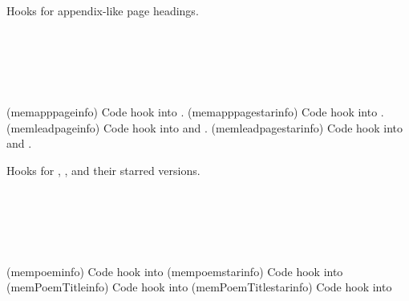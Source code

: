 Hooks for appendix-like page headings.
\begin{syntax}
\cmd{\memapppageinfo} \\
\cmd{\memapppagestarinfo} \\
\cmd{\memleadpageinfo} \\
\cmd{\memleadpagestarinfo} \\
\end{syntax}
\glossary(memapppageinfo)%
  {}%
  {Code hook into .}%
\glossary(memapppagestarinfo)%
  {}%
  {Code hook into .}%
\glossary(memleadpageinfo)%
  {}%
  {Code hook into  and .}%
\glossary(memleadpagestarinfo)%
  {}%
  {Code hook into  and .}%

Hooks for \cmd{\poemtitle}, \cmd{\PoemTitle}, and their 
starred versions.
\begin{syntax}
\cmd{\mempoeminfo} \\
\cmd{\mempoemstarinfo} \\
\cmd{\memPoemTitleinfo} \\
\cmd{\memPoemTitlestarinfo} \\
\end{syntax}
\glossary(mempoeminfo)%
  {}%
  {Code hook into }%
\glossary(mempoemstarinfo)%
  {}%
  {Code hook into }%
\glossary(memPoemTitleinfo)%
  {}%
  {Code hook into }%
\glossary(memPoemTitlestarinfo)%
  {}%
  {Code hook into }%

